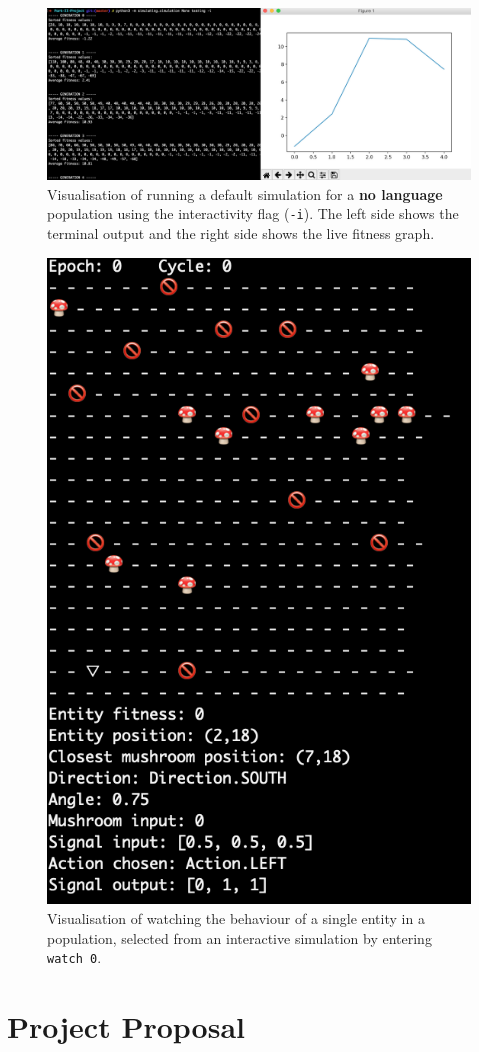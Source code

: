 \documentclass[12pt,a4paper]{report}
\begin{document}
\begin{figure}[ht]
  \centering
  \includegraphics[width=.9\linewidth]{figs/interactive}
  \caption{Visualisation of running a default simulation for a {\bf no language} population using the interactivity flag (\texttt{-i}). The left side shows the terminal output and the right side shows the live fitness graph.}
  \label{fig:interactive}
\end{figure}

\begin{figure}[ht]
  \centering
  \includegraphics[width=.9\linewidth]{figs/interactivesingle}
  \caption{Visualisation of watching the behaviour of a single entity in a population, selected from an interactive simulation by entering \texttt{watch 0}.}
  \label{fig:interactivesingle}
\end{figure}


\chapter{Project Proposal}


\end{document}
